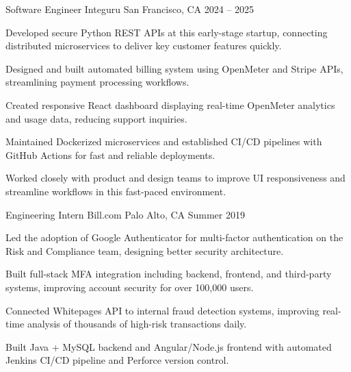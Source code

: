 \documentclass[12pt, letterpaper]{russell}
\begin{document}
\vspace{-0.2cm}
\begin{cventries}

\cventry
  {Software Engineer} %
  {Integuru} %
  {San Francisco, CA} %
  {2024 -- 2025} %
  {
\begin{cvitems}
  \item {Developed secure Python REST APIs at this early-stage startup, connecting distributed microservices to deliver key customer features quickly.}
  \item {Designed and built automated billing system using OpenMeter and Stripe APIs, streamlining payment processing workflows.}
  \item {Created responsive React dashboard displaying real-time OpenMeter analytics and usage data, reducing support inquiries.}
  \item {Maintained Dockerized microservices and established CI/CD pipelines with GitHub Actions for fast and reliable deployments.}
  \item {Worked closely with product and design teams to improve UI responsiveness and streamline workflows in this fast-paced environment.}
\end{cvitems}
}

\vspace{0.1cm}

  \cventry
    {Engineering Intern} %
    {Bill.com} %
    {Palo Alto, CA} %
    {Summer 2019} %
    {
\begin{cvitems}
  \item {Led the adoption of Google Authenticator for multi-factor authentication on the Risk and Compliance team, designing better security architecture.}
  \item {Built full-stack MFA integration including backend, frontend, and third-party systems, improving account security for over 100,000 users.}
  \item {Connected Whitepages API to internal fraud detection systems, improving real-time analysis of thousands of high-risk transactions daily.}
  \item {Built Java + MySQL backend and Angular/Node.js frontend with automated Jenkins CI/CD pipeline and Perforce version control.}
\end{cvitems}
    }


\end{cventries}
\end{document}
